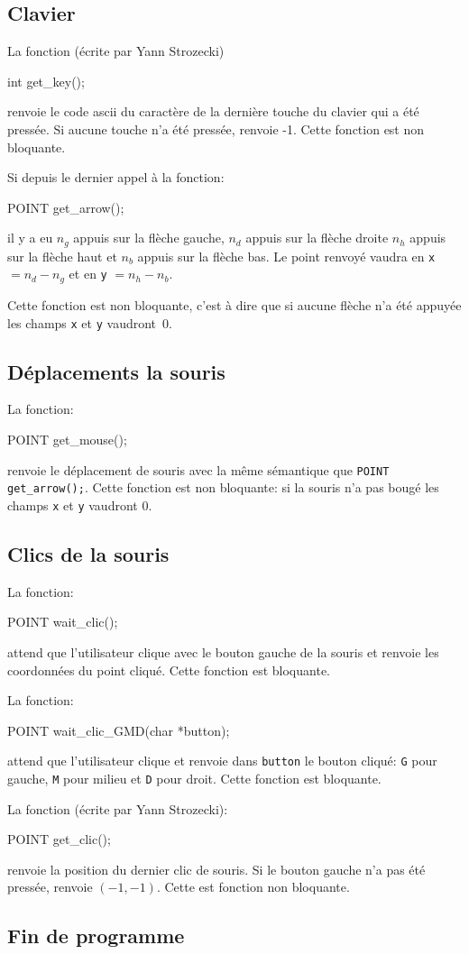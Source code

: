 \documentclass{report}
\newcommand\code[1]{
\begin{mdframed}[linecolor=purple,backgroundcolor=blue!10]
{\tt
#1
}
\end{mdframed}
}
\begin{document}
\subsection{Clavier}
La fonction (écrite par Yann Strozecki)
\code{
int get\_key();
}
renvoie le code ascii du caractère de la dernière touche du clavier qui a été pressée.
Si aucune touche n'a été pressée, renvoie -1.
Cette fonction est non bloquante.

Si depuis le dernier appel à la fonction:
\code{
POINT get\_arrow();
}
il y a eu $n_g$ appuis sur la flèche gauche, $n_d$ appuis sur la flèche droite
$n_h$ appuis sur la flèche haut et $n_b$ appuis sur la flèche bas.
Le point renvoyé vaudra en \texttt{x} $=n_d-n_g$ et en \texttt{y} $=n_h-n_b$.

Cette fonction est non bloquante, c'est à dire que si aucune flèche n'a été
appuyée les champs \texttt{x} et \texttt{y} vaudront~0.

\subsection{Déplacements la souris}
La fonction:
\code{
POINT get\_mouse();
}
renvoie le déplacement de souris avec la même sémantique que 
\texttt{POINT get\_arrow();}. Cette fonction est non bloquante:
si la souris n'a pas bougé les champs \texttt{x} et \texttt{y} vaudront 0.

\subsection{Clics de la souris}
La fonction:
\code{
POINT wait\_clic();
}
attend que l'utilisateur clique avec le bouton gauche de la souris
et renvoie les coordonnées du point cliqué. Cette fonction est bloquante.

La fonction:
\code{
POINT wait\_clic\_GMD(char *button);
}
attend que l'utilisateur clique  et renvoie dans \texttt{button} le bouton cliqué:
\texttt{G} pour gauche, \texttt{M} pour milieu et \texttt{D} pour droit.
Cette fonction est bloquante.

La fonction (écrite par Yann Strozecki):
\code{
POINT get\_clic();
}
renvoie la position du dernier clic de souris.
Si le bouton gauche n'a pas été pressée, renvoie $(-1,-1)$.
Cette est fonction non bloquante.

\subsection{Fin de programme}
\end{document}
